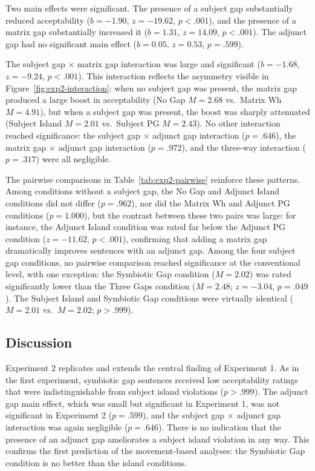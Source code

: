 \documentclass[12pt]{article}
\begin{document}
Two main effects were significant. The presence of a subject gap substantially reduced acceptability ($b = -1.90$, $z = -19.62$, $p < .001$), and the presence of a matrix gap substantially increased it ($b = 1.31$, $z = 14.09$, $p < .001$). The adjunct gap had no significant main effect ($b = 0.05$, $z = 0.53$, $p = .599$).

The subject gap $\times$ matrix gap interaction was large and significant ($b = -1.68$, $z = -9.24$, $p < .001$). This interaction reflects the asymmetry visible in Figure~\ref{fig:exp2-interaction}: when no subject gap was present, the matrix gap produced a large boost in acceptability (No Gap $M = 2.68$ vs.\ Matrix Wh $M = 4.91$), but when a subject gap was present, the boost was sharply attenuated (Subject Island $M = 2.01$ vs.\ Subject PG $M = 2.43$). No other interaction reached significance: the subject gap $\times$ adjunct gap interaction ($p = .646$), the matrix gap $\times$ adjunct gap interaction ($p = .972$), and the three-way interaction ($p = .317$) were all negligible.

The pairwise comparisons in Table~\ref{tab:exp2-pairwise} reinforce these patterns. Among conditions without a subject gap, the No Gap and Adjunct Island conditions did not differ ($p = .962$), nor did the Matrix Wh and Adjunct PG conditions ($p = 1.000$), but the contrast between these two pairs was large: for instance, the Adjunct Island condition was rated far below the Adjunct PG condition ($z = -11.62$, $p < .001$), confirming that adding a matrix gap dramatically improves sentences with an adjunct gap. Among the four subject gap conditions, no pairwise comparison reached significance at the conventional level, with one exception: the Symbiotic Gap condition ($M = 2.02$) was rated significantly lower than the Three Gaps condition ($M = 2.48$; $z = -3.04$, $p = .049$). The Subject Island and Symbiotic Gap conditions were virtually identical ($M = 2.01$ vs.\ $M = 2.02$; $p > .999$).

\FloatBarrier
\subsection{Discussion}\label{sec:exp2-discussion}

Experiment 2 replicates and extends the central finding of Experiment 1. As in the first experiment, symbiotic gap sentences received low acceptability ratings that were indistinguishable from subject island violations ($p > .999$). The adjunct gap main effect, which was small but significant in Experiment 1, was not significant in Experiment 2 ($p = .599$), and the subject gap $\times$ adjunct gap interaction was again negligible ($p = .646$). There is no indication that the presence of an adjunct gap ameliorates a subject island violation in any way. This confirms the first prediction of the movement-based analyses: the Symbiotic Gap condition is no better than the island conditions.
\end{document}
